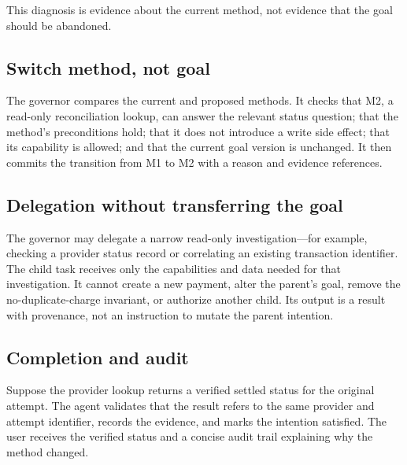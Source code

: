 This diagnosis is evidence about the current method, not evidence that the goal should be abandoned.

\subsection{Switch method, not goal}

The governor compares the current and proposed methods. It checks that M2, a read-only reconciliation lookup, can answer the relevant status question; that the method's preconditions hold; that it does not introduce a write side effect; that its capability is allowed; and that the current goal version is unchanged. It then commits the transition from M1 to M2 with a reason and evidence references.


\subsection{Delegation without transferring the goal}

The governor may delegate a narrow read-only investigation—for example, checking a provider status record or correlating an existing transaction identifier. The child task receives only the capabilities and data needed for that investigation. It cannot create a new payment, alter the parent's goal, remove the no-duplicate-charge invariant, or authorize another child. Its output is a result with provenance, not an instruction to mutate the parent intention.

\subsection{Completion and audit}

Suppose the provider lookup returns a verified settled status for the original attempt. The agent validates that the result refers to the same provider and attempt identifier, records the evidence, and marks the intention satisfied. The user receives the verified status and a concise audit trail explaining why the method changed.

